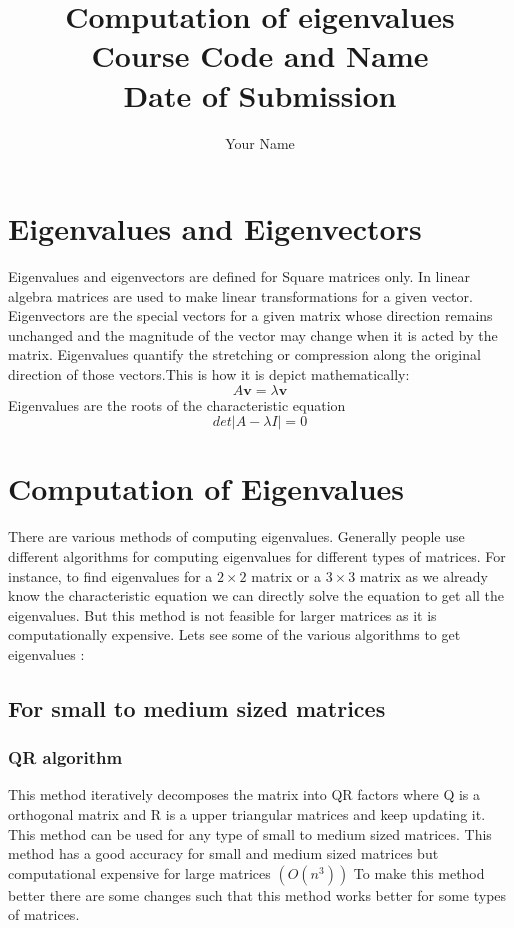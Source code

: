 \documentclass[a4paper,12pt]{article}
\title{
    \vspace{2cm} %
    \vspace{1cm} %
    \textbf{\Huge Computation of eigenvalues} \\
    \vspace{1cm} %
    \large Course Code and Name \\
    \vspace{0.5cm} %
    \large Date of Submission
}
\author{Your Name}
\date{}
\begin{document}
\maketitle
\thispagestyle{empty}
\newpage

\setcounter{page}{1}  %
\tableofcontents
\newpage

\maketitle
\section{Eigenvalues and Eigenvectors }
Eigenvalues and eigenvectors are defined for Square matrices only. In linear algebra matrices are used to make linear transformations for a given vector. Eigenvectors are the special vectors for a given matrix whose direction remains unchanged and the magnitude of the vector may change when it is acted by the matrix. Eigenvalues quantify the stretching or compression along the original direction of those vectors.This is how it is depict mathematically:
    $$A\textbf{v}=\lambda \textbf{v}$$
Eigenvalues are the roots of the characteristic equation
$$det|A-\lambda I|=0$$
\section{Computation of Eigenvalues}
There are various methods of computing eigenvalues. Generally people use different algorithms for computing eigenvalues for different types of matrices. For instance, to find eigenvalues for a $2\times2$ matrix or a $3\times 3$ matrix as we already know the characteristic equation we can directly solve the equation to get all the eigenvalues. But this method is not feasible for larger matrices as it is computationally expensive. 
Lets see some of the various algorithms to get eigenvalues :
\subsection{For small to medium sized matrices}
\subsubsection{QR algorithm}
This method iteratively decomposes the matrix into QR factors where Q is a orthogonal matrix and R is a upper triangular matrices and keep updating it.
This method can be used for any type of small to medium sized matrices. This method has a good accuracy for small and medium sized matrices but computational expensive for large matrices $\left(O\left(n^3\right)\right)$
To make this method better there are some changes such that this method works better for some types of matrices.
\end{document}
